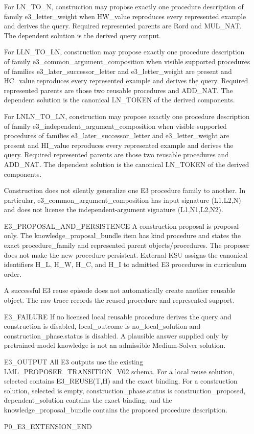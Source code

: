 For LN_TO_N, construction may propose exactly one procedure description of
family e3_letter_weight when HW_value reproduces every represented example and
derives the query.  Required represented parents are Rord and MUL_NAT.  The
dependent solution is the derived query output.

For LLN_TO_LN, construction may propose exactly one procedure description of
family e3_common_argument_composition when visible supported procedures of
families e3_later_successor_letter and e3_letter_weight are present and
HC_value reproduces every represented example and derives the query.  Required
represented parents are those two reusable procedures and ADD_NAT.  The
dependent solution is the canonical LN_TOKEN of the derived components.

For LNLN_TO_LN, construction may propose exactly one procedure description of
family e3_independent_argument_composition when visible supported procedures of
families e3_later_successor_letter and e3_letter_weight are present and
HI_value reproduces every represented example and derives the query.  Required
represented parents are those two reusable procedures and ADD_NAT.  The
dependent solution is the canonical LN_TOKEN of the derived components.

Construction does not silently generalize one E3 procedure family to another.
In particular, e3_common_argument_composition has input signature
(L1,L2,N) and does not license the independent-argument signature
(L1,N1,L2,N2).

E3_PROPOSAL_AND_PERSISTENCE
A construction proposal is proposal-only.  The knowledge_proposal_bundle item
has kind procedure and states the exact procedure_family and represented parent
objects/procedures.  The proposer does not make the new procedure persistent.
External KSU assigns the canonical identifiers H_L, H_W, H_C, and H_I to
admitted E3 procedures in curriculum order.

A successful E3 reuse episode does not automatically create another reusable
object.  The raw trace records the reused procedure and represented support.

E3_FAILURE
If no licensed local reusable procedure derives the query and construction is
disabled, local_outcome is no_local_solution and construction_phase.status is
disabled.  A plausible answer supplied only by pretrained model knowledge is
not an admissible Medium-Solver solution.

E3_OUTPUT
All E3 outputs use the existing LML_PROPOSER_TRANSITION_V02 schema.  For a
local reuse solution, selected contains E3_REUSE(T,H) and the exact binding.
For a construction solution, selected is empty, construction_phase.status is
construction_proposed, dependent_solution contains the exact binding, and the
knowledge_proposal_bundle contains the proposed procedure description.

P0_E3_EXTENSION_END
